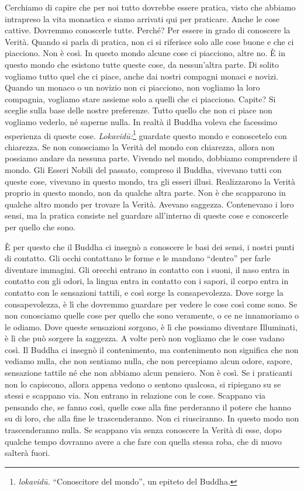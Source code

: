 Cerchiamo di capire che per noi tutto dovrebbe essere pratica, visto che
abbiamo intrapreso la vita monastica e siamo arrivati qui per praticare.
Anche le cose cattive. Dovremmo conoscerle tutte. Perché? Per essere in
grado di conoscere la Verità. Quando si parla di pratica, non ci si
riferisce solo alle cose buone e che ci piacciono. Non è così. In questo
mondo alcune cose ci piacciono, altre no. È in questo mondo che esistono
tutte queste cose, da nessun'altra parte. Di solito vogliamo tutto quel
che ci piace, anche dai nostri compagni monaci e novizi. Quando un
monaco o un novizio non ci piacciono, non vogliamo la loro compagnia,
vogliamo stare assieme solo a quelli che ci piacciono. Capite? Si
sceglie sulla base delle nostre preferenze. Tutto quello che non ci
piace non vogliamo vederlo, né saperne nulla. In realtà il Buddha voleva
che facessimo esperienza di queste cose. \emph{Lokavidū:}\footnote{\emph{lokavidū.}
  ``Conoscitore del mondo'', un epiteto del Buddha.} guardate questo
mondo e conoscetelo con chiarezza. Se non conosciamo la Verità del mondo
con chiarezza, allora non possiamo andare da nessuna parte. Vivendo nel
mondo, dobbiamo comprendere il mondo. Gli Esseri Nobili del passato,
compreso il Buddha, vivevano tutti con queste cose, vivevano in questo
mondo, tra gli esseri illusi. Realizzarono la Verità proprio in questo
mondo, non da qualche altra parte. Non è che scapparono in qualche altro
mondo per trovare la Verità. Avevano saggezza. Contenevano i loro sensi,
ma la pratica consiste nel guardare all'interno di queste cose e
conoscerle per quello che sono.

È per questo che il Buddha ci insegnò a conoscere le basi dei sensi, i
nostri punti di contatto. Gli occhi contattano le forme e le mandano
``dentro'' per farle diventare immagini. Gli orecchi entrano in contatto
con i suoni, il naso entra in contatto con gli odori, la lingua entra in
contatto con i sapori, il corpo entra in contatto con le sensazioni
tattili, e così sorge la consapevolezza. Dove sorge la consapevolezza, è
lì che dovremmo guardare per vedere le cose così come sono. Se non
conosciamo quelle cose per quello che sono veramente, o ce ne
innamoriamo o le odiamo. Dove queste sensazioni sorgono, è lì che
possiamo diventare Illuminati, è lì che può sorgere la saggezza. A volte
però non vogliamo che le cose vadano così. Il Buddha ci insegnò il
contenimento, ma contenimento non significa che non vediamo nulla, che
non sentiamo nulla, che non percepiamo alcun odore, sapore, sensazione
tattile né che non abbiamo alcun pensiero. Non è così. Se i praticanti
non lo capiscono, allora appena vedono o sentono qualcosa, si ripiegano
su se stessi e scappano via. Non entrano in relazione con le cose.
Scappano via pensando che, se fanno così, quelle cose alla fine
perderanno il potere che hanno su di loro, che alla fine le
trascenderanno. Non ci riusciranno. In questo modo non trascenderanno
nulla. Se scappano via senza conoscere la Verità di esse, dopo qualche
tempo dovranno avere a che fare con quella stessa roba, che di nuovo
salterà fuori.


